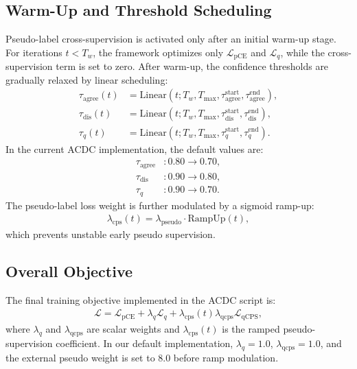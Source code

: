 \subsection{Warm-Up and Threshold Scheduling}
\label{subsec:schedule}
Pseudo-label cross-supervision is activated only after an initial warm-up stage. For iterations $t < T_w$, the framework optimizes only $\mathcal{L}_{\mathrm{pCE}}$ and $\mathcal{L}_q$, while the cross-supervision term is set to zero. After warm-up, the confidence thresholds are gradually relaxed by linear scheduling:
\begin{align}
    \tau_{\mathrm{agree}}(t)
    &= \mathrm{Linear}(t; T_w, T_{\max}, \tau_{\mathrm{agree}}^{\mathrm{start}}, \tau_{\mathrm{agree}}^{\mathrm{end}}), \\
    \tau_{\mathrm{dis}}(t)
    &= \mathrm{Linear}(t; T_w, T_{\max}, \tau_{\mathrm{dis}}^{\mathrm{start}}, \tau_{\mathrm{dis}}^{\mathrm{end}}), \\
    \tau_{q}(t)
    &= \mathrm{Linear}(t; T_w, T_{\max}, \tau_{q}^{\mathrm{start}}, \tau_{q}^{\mathrm{end}}).
\end{align}
In the current ACDC implementation, the default values are:
\begin{align}
    \tau_{\mathrm{agree}} &: 0.80 \rightarrow 0.70, \\
    \tau_{\mathrm{dis}} &: 0.90 \rightarrow 0.80, \\
    \tau_{q} &: 0.90 \rightarrow 0.70.
\end{align}
The pseudo-label loss weight is further modulated by a sigmoid ramp-up:
\begin{align}
    \lambda_{\mathrm{cps}}(t)
    =
    \lambda_{\mathrm{pseudo}}
    \cdot
    \mathrm{RampUp}(t),
\end{align}
which prevents unstable early pseudo supervision.

\subsection{Overall Objective}
\label{subsec:overall_objective}
The final training objective implemented in the ACDC script is:
\begin{align}
    \mathcal{L}
    =
    \mathcal{L}_{\mathrm{pCE}}
    +
    \lambda_q \mathcal{L}_q
    +
    \lambda_{\mathrm{cps}}(t)\lambda_{\mathrm{qcps}}\mathcal{L}_{\mathrm{qCPS}},
\end{align}
where $\lambda_q$ and $\lambda_{\mathrm{qcps}}$ are scalar weights and $\lambda_{\mathrm{cps}}(t)$ is the ramped pseudo-supervision coefficient. In our default implementation, $\lambda_q=1.0$, $\lambda_{\mathrm{qcps}}=1.0$, and the external pseudo weight is set to $8.0$ before ramp modulation.

